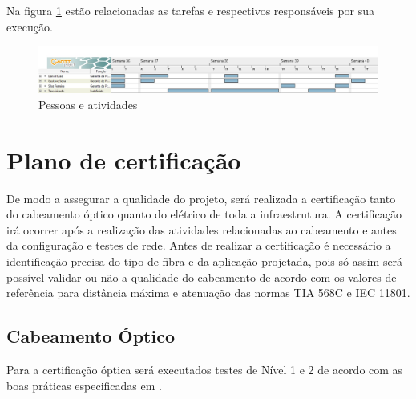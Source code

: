 \documentclass[	DIV=calc,%
							paper=a4,%
							fontsize=12pt,%
							onecolumn]{scrartcl}	 					%
\begin{document}
Na figura \ref{pessoas} estão relacionadas as tarefas e respectivos responsáveis por sua execução.

\begin{figure}
\centering
\includegraphics[width=\textwidth]{pessoas}
\caption{Pessoas e atividades}
\label{pessoas}
\end{figure}



\section{Plano de certificação}
De modo a assegurar a qualidade do projeto, será realizada a certificação tanto do cabeamento óptico quanto do elétrico de toda a infraestrutura.
A certificação irá ocorrer após a realização das atividades relacionadas ao cabeamento e antes da configuração e testes de rede.
Antes de realizar a certificação é necessário a identificação precisa do tipo de fibra e da aplicação projetada, pois só assim será possível validar ou não a qualidade do cabeamento
de acordo com os valores de referência para distância máxima e atenuação das normas TIA 568C e IEC 11801. 

\subsection{Cabeamento Óptico}
Para a certificação óptica será executados testes de Nível 1 e 2 de acordo com as boas práticas especificadas em \cite{ref6}.
\end{document}
